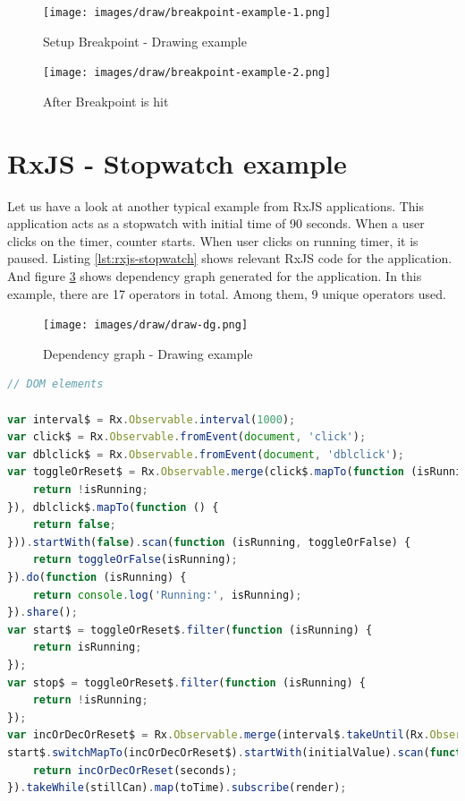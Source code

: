 \begin{figure}[h]
	\centering
	\texttt{[image: images/draw/breakpoint-example-1.png]}
	\caption{Setup Breakpoint - Drawing example}
	\label{fig:rxjs-draw-bp}
\end{figure}

\begin{figure}[h]
	\centering
	\texttt{[image: images/draw/breakpoint-example-2.png]}
	\caption{After Breakpoint is hit}
	\label{fig:rxjs-draw-bp2}
\end{figure}


\section{RxJS - Stopwatch example}
Let us have a look at another typical example from RxJS applications. This application acts as a stopwatch with initial time of 90 seconds. When a user clicks on the timer, counter starts. When user clicks on running timer, it is paused. Listing \ref{lst:rxjs-stopwatch} shows relevant RxJS code for the application. And figure \ref{fig:rxjs-sw-dg} shows dependency graph generated for the application. In this example, there are 17 operators in total. Among them, 9 unique operators used. 

\begin{figure}[!h]
	\centering
	\texttt{[image: images/draw/draw-dg.png]}
	\caption{Dependency graph - Drawing example}
	\label{fig:rxjs-sw-dg}
\end{figure}

\begin{lstlisting}[language=JavaScript, caption=RxJS - Stopwatch example, label={lst:rxjs-stopwatch}]
// DOM elements

var interval$ = Rx.Observable.interval(1000);
var click$ = Rx.Observable.fromEvent(document, 'click');
var dblclick$ = Rx.Observable.fromEvent(document, 'dblclick');
var toggleOrReset$ = Rx.Observable.merge(click$.mapTo(function (isRunning) {
	return !isRunning;
}), dblclick$.mapTo(function () {
	return false;
})).startWith(false).scan(function (isRunning, toggleOrFalse) {
	return toggleOrFalse(isRunning);
}).do(function (isRunning) {
	return console.log('Running:', isRunning);
}).share();
var start$ = toggleOrReset$.filter(function (isRunning) {
	return isRunning;
});
var stop$ = toggleOrReset$.filter(function (isRunning) {
	return !isRunning;
});
var incOrDecOrReset$ = Rx.Observable.merge(interval$.takeUntil(Rx.Observable.merge(stop$, dblclick$)).mapTo(incOrDec), dblclick$.mapTo(reset));
start$.switchMapTo(incOrDecOrReset$).startWith(initialValue).scan(function (seconds, incOrDecOrReset) {
	return incOrDecOrReset(seconds);
}).takeWhile(stillCan).map(toTime).subscribe(render);

\end{lstlisting}


